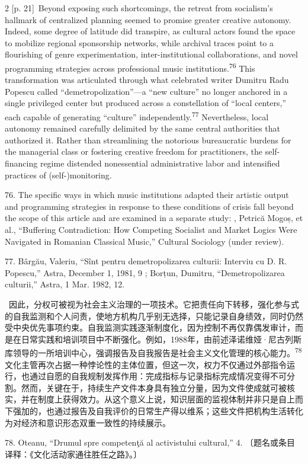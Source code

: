 \documentclass[10pt,a4paper]{article}
\begin{document}
\begin{paracol}{2}
\switchcolumn
{\scriptsize\color{gray} [p. 21]}\ Beyond exposing such shortcomings, the retreat from socialism’s hallmark of centralized planning seemed to promise greater creative autonomy. Indeed, some degree of latitude did transpire, as cultural actors found the space to mobilize regional sponsorship networks, while archival traces point to a flourishing of genre experimentation, inter-institutional collaborations, and novel programming strategies across professional music institutions.\nobreak\textsuperscript{76} This transformation was articulated through what celebrated writer Dumitru Radu Popescu called “demetropolization”—a “new culture” no longer anchored in a single privileged center but produced across a constellation of “local centers,” each capable of generating “culture” independently.\nobreak\textsuperscript{77} Nevertheless, local autonomy remained carefully delimited by the same central authorities that authorized it. Rather than streamlining the notorious bureaucratic burdens for the managerial class or fostering creative freedom for practitioners, the self-financing regime distended nonessential administrative labor and intensified practices of (self-)monitoring.\par{\small 76. The specific ways in which music institutions adapted their artistic output and programming strategies in response to these conditions of crisis fall beyond the scope of this article and are examined in a separate study: , Petrică Mogoș, et al., “Buffering Contradiction: How Competing Socialist and Market Logics Were Navigated in Romanian Classical Music,” Cultural Sociology (under review).\par}{\small 77. Bârgău, Valeriu, “Sînt pentru demetropolizarea culturii: Interviu cu D. R. Popescu,” Astra, December 1, 1981, 9 ; Borțun, Dumitru, “Demetropolizarea culturii,” Astra, 1 Mar. 1982, 12.\par}
\switchcolumn*
{\scriptsize\color{gray} [p. 21]}\ 因此，分权可被视为社会主义治理的一项技术。它把责任向下转移，强化参与式的自我监测和个人问责，使地方机构几乎别无选择，只能记录自身绩效，同时仍然受中央优先事项约束。自我监测实践逐渐制度化，因为控制不再仅靠偶发审计，而是在日常实践和培训项目中不断强化。例如，1988年，由前述泽诺维娅·尼古列斯库领导的一所培训中心，强调报告及自我报告是社会主义文化管理的核心能\mbox{力。\textsuperscript{78}}文化主管再次占据一种悖论性的主体位置，但这一次，权力不仅通过外部指令运行，也通过自愿的自我规制发挥作用：完成指标与记录指标完成情况变得不可分割。然而，关键在于，持续生产文件本身具有独立分量，因为文件使成就可被核实，并在制度上获得效力。从这个意义上说，知识层面的监视体制并非只是自上而下强加的，也通过报告及自我评价的日常生产得以维系；这些文件把机构生活转化为对经济和意识形态双重一致性的持续展示。\par{\small 78. Oteanu, “Drumul spre competenţă al activistului cultural,” 4. 〔题名或条目译释：《文化活动家通往胜任之路》。〕\par}

\end{paracol}
\end{document}
